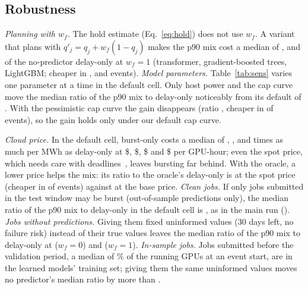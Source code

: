 \subsection{Robustness}
\emph{Planning with $w_f$.} The hold estimate (Eq.~\ref{eq:hold}) does not use $w_f$. A variant that plans with $q'_j=q_j+w_f(1-q_j)$ makes the p90 mix cost a median of \PlanwfTransOverBlind{}, \PlanwfGbdtOverBlind{} and \PlanwfLightgbmOverBlind{} of the no-predictor delay-only at $w_f=1$ (transformer, gradient-boosted trees, LightGBM; cheaper in \PlanwfTransOverBlindCheaper{}, \PlanwfGbdtOverBlindCheaper{} and \PlanwfLightgbmOverBlindCheaper{} events).
\emph{Model parameters.} Table~\ref{tab:sens} varies one parameter at a time in the default cell. Only host power and the cap curve move the median ratio of the p90 mix to delay-only noticeably from its default of \SensDefaultRatio{}. With the pessimistic cap curve the gain disappears (ratio \SensPessimisticRatio{}, cheaper in \SensPessimisticCheaper{} of \SensEvents{} events), so the gain holds only under our default cap curve.

\emph{Cloud price.} In the default cell, burst-only costs a median of \PriceSpotBurstOverDelay{}, \PriceLowBurstOverDelay{}, \PriceBaseBurstOverDelay{} and \PriceDoubleBurstOverDelay{} times as much per MWh as delay-only at \$\PriceSpotUsd{}, \$\PriceLowUsd{}, \$\PriceBaseUsd{} and \$\PriceDoubleUsd{} per GPU-hour; even the spot price, which needs care with deadlines~\cite{wu24}, leaves bursting far behind. With the oracle, a lower price helps the mix: its ratio to the oracle's delay-only is \PriceSpotOracleMixOverDelay{} at the spot price (cheaper in \PriceSpotOracleMixCheaper{} of \SensEvents{} events) against \PriceBaseOracleMixOverDelay{} at the base price.
\emph{Clean jobs.} If only jobs submitted in the test window may be burst (out-of-sample predictions only), the median ratio of the p90 mix to delay-only in the default cell is \OosMixPNineOverDelayZero{}, as in the main run (\DefMixPNineOverDelayZero{}).
\emph{Jobs without predictions.} Giving them fixed uninformed values (30 days left, no failure risk) instead of their true values leaves the median ratio of the p90 mix to delay-only at \RobustUninfMixOverDelayZero{} ($w_f=0$) and \RobustUninfMixOverDelayOne{} ($w_f=1$).
\emph{In-sample jobs.} Jobs submitted before the validation period, a median of \InsampleRunningGpusPct\% of the running GPUs at an event start, are in the learned models' training set; giving them the same uninformed values moves no predictor's median ratio by more than \LearnedMaskShiftMax{}.


